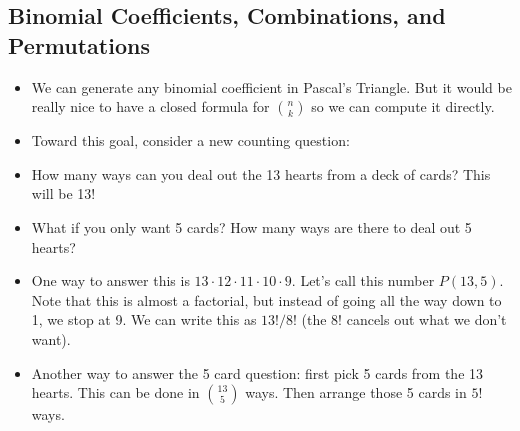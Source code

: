 \documentclass[12pt]{article}
\theoremstyle{plain}
\theoremstyle{definition}
\theoremstyle{remark}
\begin{document}
\subsection*{Binomial Coefficients, Combinations, and Permutations}
\begin{itemize}

\item We can generate any binomial coefficient in Pascal's Triangle.  But it would be really nice to have a closed formula for $\binom{n}{k}$ so we can compute it directly.

\item Toward this goal, consider a new counting question:

\item How many ways can you deal out the 13 hearts from a deck of cards?  This will be 13!

\item What if you only want 5 cards?  How many ways are there to deal out 5 hearts?

\item One way to answer this is $13\cdot 12\cdot 11\cdot 10 \cdot 9$.  Let's call this number $P(13,5)$.  Note that this is almost a factorial, but instead of going all the way down to 1, we stop at 9.  We can write this as $13!/8!$ (the 8! cancels out what we don't want).

\item Another way to answer the 5 card question: first pick 5 cards from the 13 hearts.  This can be done in $\binom{13}{5}$ ways.  Then arrange those 5 cards in $5!$ ways.


\end{itemize}
\end{document}
